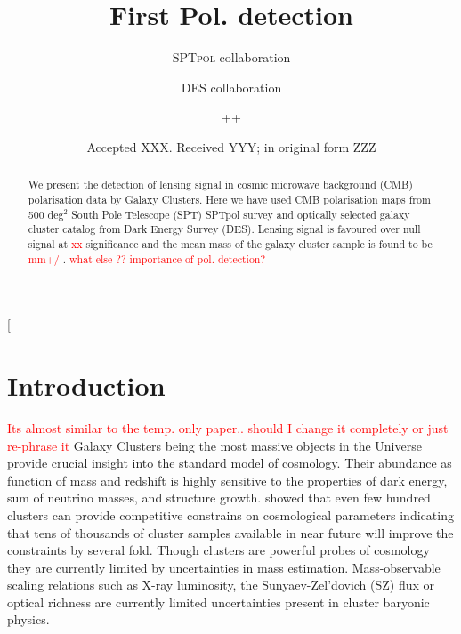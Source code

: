 \documentclass[twocolumn]{aastex61}
\newcommand{\pending}[1]{\textcolor{red}{#1}}
\newcommand{\sptpol}{\textsc{SPTpol}}
\newcommand{\des}{\textsc{DES}}
\newcommand{\RM}{redMaPPer} %
\begin{document}
\title{First Pol. detection}
\author{\textsc{SPTpol
} collaboration}[
\author{\textsc{DES} collaboration}
\author{ ++ }


\date{Accepted XXX. Received YYY; in original form ZZZ}
\begin{abstract}
We present the detection of lensing signal in cosmic microwave background (CMB) polarisation data by Galaxy Clusters. Here we have used CMB polarisation maps from 500 deg$^2$ South Pole Telescope (SPT) SPTpol survey and optically selected galaxy cluster catalog from Dark Energy Survey (DES). Lensing signal is favoured over null signal at \pending{xx} significance and the mean mass of the galaxy cluster sample is found to be \pending{mm+/-}.
\pending{what else ?? importance of pol. detection?}
\end{abstract}



\section{Introduction}\label{sec_intro}

\pending{Its almost similar to the temp. only paper.. should I change it completely or just re-phrase it}
Galaxy Clusters being the most massive objects in the Universe provide crucial insight into the standard model of cosmology. Their abundance as function of mass and redshift is highly sensitive to the properties of dark energy, sum of neutrino masses, and structure growth\citep[and references therein]{lesgourgues05, wang05,haiman01, weinberg13}. \citet{dehaan16} showed that even few hundred clusters can provide competitive constrains on cosmological parameters indicating that tens of thousands of cluster samples available in near future \citep{lsst09, erosita12, benson14, henderson16, cmbs4-sb1} will improve the constraints by several fold. Though clusters are powerful probes of cosmology they are currently limited by uncertainties in mass estimation. Mass-observable scaling relations such as X-ray luminosity, the Sunyaev-Zel{'}dovich (SZ) flux or optical richness \citep{appelgate14,linden14} are currently limited uncertainties \citep{hasselfield:2013} present in cluster baryonic physics. 
\end{document}
